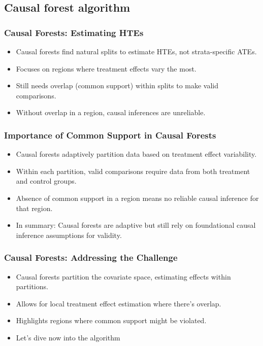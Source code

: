 \documentclass{beamer}
\begin{document}
\subsection{Causal forest algorithm}


\begin{frame}
\frametitle{Causal Forests: Estimating HTEs}
\begin{itemize}
\item Causal forests find natural splits to estimate HTEs, not strata-specific ATEs.
\item Focuses on regions where treatment effects vary the most.
\item Still needs overlap (common support) within splits to make valid comparisons.
\item Without overlap in a region, causal inferences are unreliable.
\end{itemize}
\end{frame}

\begin{frame}
\frametitle{Importance of Common Support in Causal Forests}
\begin{itemize}
\item Causal forests adaptively partition data based on treatment effect variability.
\item Within each partition, valid comparisons require data from both treatment and control groups.
\item Absence of common support in a region means no reliable causal inference for that region.
\item In summary: Causal forests are adaptive but still rely on foundational causal inference assumptions for validity.
\end{itemize}
\end{frame}




\begin{frame}
\frametitle{Causal Forests: Addressing the Challenge}
\begin{itemize}
    \item Causal forests partition the covariate space, estimating effects within partitions.
    \item Allows for local treatment effect estimation where there's overlap.
    \item Highlights regions where common support might be violated.
    \item Let's dive now into the algorithm
\end{itemize}
\end{frame}
\end{document}
